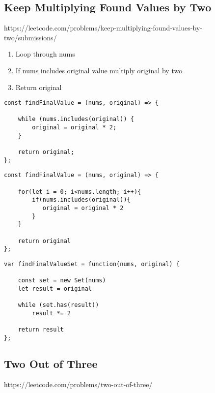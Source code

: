 \documentclass[10pt]{article}
\begin{document}
\pagebreak %
\medskip   
\subsection{Keep Multiplying Found Values by Two}
https://leetcode.com/problems/keep-multiplying-found-values-by-two/submissions/

\begin{enumerate}
	\item Loop through nums
	\item If nums includes original value multiply original by two 
	\item Return original
\end{enumerate}

\begin{lstlisting}[title=Solution findFinalValue with while loop, captionpos=t]
const findFinalValue = (nums, original) => {

    while (nums.includes(original)) {
        original = original * 2;
    }

    return original;
};
\end{lstlisting}


\begin{lstlisting}[title=Solution findFinalValue with for loop, captionpos=t]
const findFinalValue = (nums, original) => {
        
    for(let i = 0; i<nums.length; i++){
        if(nums.includes(original)){
           original = original * 2
        }
    }
    
    return original
};
\end{lstlisting}

\begin{lstlisting}[title=Solution findFinalValue with set, captionpos=t]
var findFinalValueSet = function(nums, original) {

    const set = new Set(nums)
    let result = original
    
    while (set.has(result))
        result *= 2

    return result
};
\end{lstlisting}

\medskip %







\pagebreak %
\medskip   
\subsection{Two Out of Three}
https://leetcode.com/problems/two-out-of-three/
\end{document}
